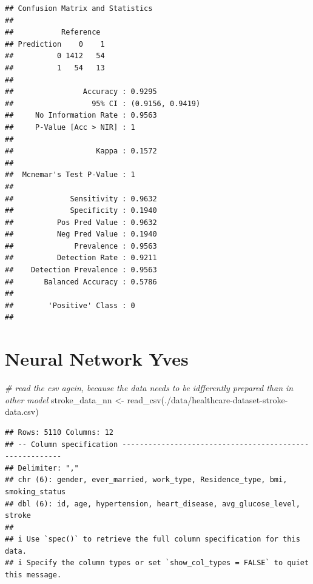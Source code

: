 \documentclass[
]{article}
\newenvironment{Shaded}{\begin{snugshade}}{\end{snugshade}}
\newcommand{\CommentTok}[1]{\textcolor[rgb]{0.56,0.35,0.01}{\textit{#1}}}
\newcommand{\FunctionTok}[1]{\textcolor[rgb]{0.00,0.00,0.00}{#1}}
\newcommand{\NormalTok}[1]{#1}
\newcommand{\OtherTok}[1]{\textcolor[rgb]{0.56,0.35,0.01}{#1}}
\newcommand{\StringTok}[1]{\textcolor[rgb]{0.31,0.60,0.02}{#1}}
\renewcommand{\=}[1]{\stackrel{#1}{=}}
\theoremstyle{definition}
\theoremstyle{remark}
\begin{document}
\begin{verbatim}
## Confusion Matrix and Statistics
## 
##           Reference
## Prediction    0    1
##          0 1412   54
##          1   54   13
##                                           
##                Accuracy : 0.9295          
##                  95% CI : (0.9156, 0.9419)
##     No Information Rate : 0.9563          
##     P-Value [Acc > NIR] : 1               
##                                           
##                   Kappa : 0.1572          
##                                           
##  Mcnemar's Test P-Value : 1               
##                                           
##             Sensitivity : 0.9632          
##             Specificity : 0.1940          
##          Pos Pred Value : 0.9632          
##          Neg Pred Value : 0.1940          
##              Prevalence : 0.9563          
##          Detection Rate : 0.9211          
##    Detection Prevalence : 0.9563          
##       Balanced Accuracy : 0.5786          
##                                           
##        'Positive' Class : 0               
## 
\end{verbatim}

\hypertarget{neural-network-yves}{%
\section{Neural Network Yves}\label{neural-network-yves}}

\begin{Shaded}
\begin{Highlighting}[]
\CommentTok{\# read the csv agein, because the data needs to be idfferently prepared than in other model}
\NormalTok{stroke\_data\_nn }\OtherTok{\textless{}{-}} \FunctionTok{read\_csv}\NormalTok{(}\StringTok{\textquotesingle{}./data/healthcare{-}dataset{-}stroke{-}data.csv\textquotesingle{}}\NormalTok{)}
\end{Highlighting}
\end{Shaded}

\begin{verbatim}
## Rows: 5110 Columns: 12
## -- Column specification --------------------------------------------------------
## Delimiter: ","
## chr (6): gender, ever_married, work_type, Residence_type, bmi, smoking_status
## dbl (6): id, age, hypertension, heart_disease, avg_glucose_level, stroke
## 
## i Use `spec()` to retrieve the full column specification for this data.
## i Specify the column types or set `show_col_types = FALSE` to quiet this message.
\end{verbatim}
\end{document}
